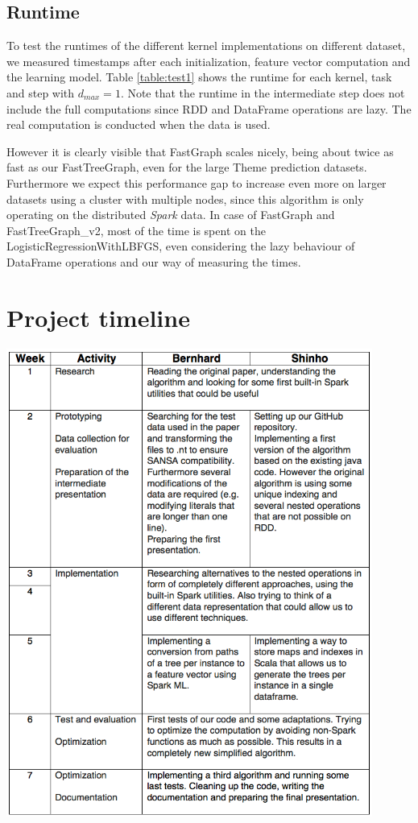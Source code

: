 \documentclass{easychair}
\begin{document}
\subsection{Runtime}
To test the runtimes of the different kernel implementations on different dataset, we measured timestamps after each initialization, feature vector computation and the learning model. Table \ref{table:test1} shows the runtime for each kernel, task and step with $d_{max}=1$. Note that the runtime in the intermediate step does not include the full computations since RDD and DataFrame operations are lazy. The real computation is conducted when the data is used. 

However it is clearly visible that FastGraph scales nicely, being about twice as fast as our FastTreeGraph, even for the large Theme prediction datasets. Furthermore we expect this performance gap to increase even more on larger datasets using a cluster with multiple nodes, since this algorithm is only operating on the distributed \textit{Spark} data. In case of FastGraph and FastTreeGraph\_v2, most of the time is spent on the LogisticRegressionWithLBFGS, even considering the lazy behaviour of DataFrame operations and our way of measuring the times.
\section{Project timeline}
\includegraphics[width=12cm]{Timeline.png}
\end{document}
